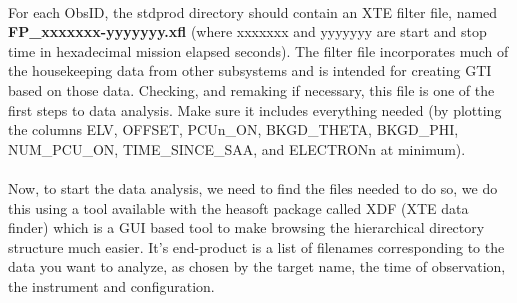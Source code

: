 \documentclass[a4paper,twoside]{report}
\numberwithin{equation}{section}
\begin{document}
\paragraph{}
For each ObsID, the stdprod directory should contain an XTE filter file, named \textbf{FP\_xxxxxxx-yyyyyyy.xfl} (where xxxxxxx and yyyyyyy are start and stop time in hexadecimal mission elapsed seconds). The filter file incorporates much of the housekeeping data from other subsystems and is intended for creating GTI based on those data. Checking, and remaking if necessary, this file is one of the first steps to data analysis. Make sure it includes everything needed (by plotting the columns ELV, OFFSET, PCUn\_ON, BKGD\_THETA, BKGD\_PHI, NUM\_PCU\_ON, TIME\_SINCE\_SAA, and ELECTRONn at minimum).
\paragraph{}
Now, to start the data analysis, we need to find the files needed to do so, we do this using a tool available with the heasoft package called XDF (XTE data finder) which is a GUI based tool to make browsing the hierarchical directory structure much easier. It's end-product is a list of filenames corresponding to the data you want to analyze, as chosen by the target name, the time of observation, the instrument and configuration. 
\end{document}
